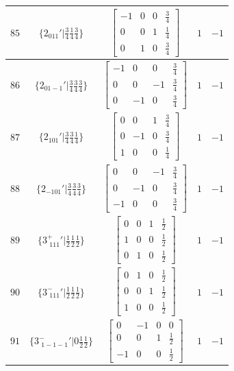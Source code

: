 \documentclass[fleqn,8pt]{jsarticle}
\begin{document}
\begin{longtable}{ccccc}
$ 85 $ & $ \{2{}_{011}{}'|\frac{3}{4} \frac{1}{4} \frac{3}{4}\} $ & $ \begin{bmatrix} -1 & 0 & 0 & \frac{3}{4} \\ 0 & 0 & 1 & \frac{1}{4} \\ 0 & 1 & 0 & \frac{3}{4} \end{bmatrix} $ & $ 1 $ & $ -1 $ \\ \hline
$ 86 $ & $ \{2{}_{01-1}{}'|\frac{3}{4} \frac{3}{4} \frac{3}{4}\} $ & $ \begin{bmatrix} -1 & 0 & 0 & \frac{3}{4} \\ 0 & 0 & -1 & \frac{3}{4} \\ 0 & -1 & 0 & \frac{3}{4} \end{bmatrix} $ & $ 1 $ & $ -1 $ \\ \hline
$ 87 $ & $ \{2{}_{101}{}'|\frac{3}{4} \frac{3}{4} \frac{1}{4}\} $ & $ \begin{bmatrix} 0 & 0 & 1 & \frac{3}{4} \\ 0 & -1 & 0 & \frac{3}{4} \\ 1 & 0 & 0 & \frac{1}{4} \end{bmatrix} $ & $ 1 $ & $ -1 $ \\ \hline
$ 88 $ & $ \{2{}_{-101}{}'|\frac{3}{4} \frac{3}{4} \frac{3}{4}\} $ & $ \begin{bmatrix} 0 & 0 & -1 & \frac{3}{4} \\ 0 & -1 & 0 & \frac{3}{4} \\ -1 & 0 & 0 & \frac{3}{4} \end{bmatrix} $ & $ 1 $ & $ -1 $ \\ \hline
$ 89 $ & $ \{3^{+}_{\,\,111}{}'|\frac{1}{2} \frac{1}{2} \frac{1}{2}\} $ & $ \begin{bmatrix} 0 & 0 & 1 & \frac{1}{2} \\ 1 & 0 & 0 & \frac{1}{2} \\ 0 & 1 & 0 & \frac{1}{2} \end{bmatrix} $ & $ 1 $ & $ -1 $ \\ \hline
$ 90 $ & $ \{3^{-}_{\,\,111}{}'|\frac{1}{2} \frac{1}{2} \frac{1}{2}\} $ & $ \begin{bmatrix} 0 & 1 & 0 & \frac{1}{2} \\ 0 & 0 & 1 & \frac{1}{2} \\ 1 & 0 & 0 & \frac{1}{2} \end{bmatrix} $ & $ 1 $ & $ -1 $ \\ \hline
$ 91 $ & $ \{3^{-}_{\,\,1-1-1}{}'|0 \frac{1}{2} \frac{1}{2}\} $ & $ \begin{bmatrix} 0 & -1 & 0 & 0 \\ 0 & 0 & 1 & \frac{1}{2} \\ -1 & 0 & 0 & \frac{1}{2} \end{bmatrix} $ & $ 1 $ & $ -1 $ \\ \hline

\end{longtable}
\end{document}
